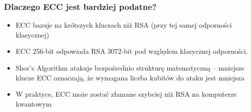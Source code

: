 \begin{frame}
    \frametitle{Dlaczego ECC jest bardziej podatne?}
    \begin{itemize}
        \item ECC bazuje na krótszych kluczach niż RSA (przy tej samej odporności klasycznej)
        \item ECC 256-bit odpowiada RSA 3072-bit pod względem klasycznej odporności.
        \item Shor’s Algorithm atakuje bezpośrednio strukturę matematyczną – mniejsze klucze ECC oznaczają, że wymagana liczba kubitów do ataku jest mniejsza
        \item W praktyce, ECC może zostać złamane szybciej niż RSA na komputerze kwantowym
    \end{itemize}
\end{frame}








